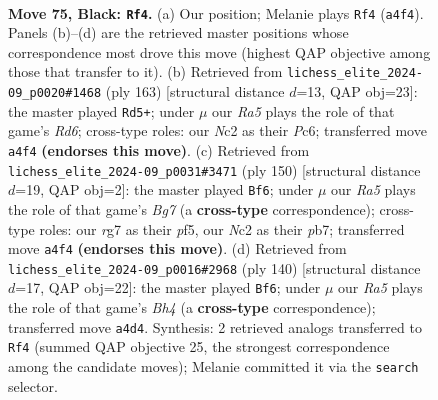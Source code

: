 \documentclass[11pt]{article}
\begin{document}
\clearpage

\begin{figure}[p]\centering
\begin{subfigure}{0.46\textwidth}\centering
\resizebox{\linewidth}{!}{%
\newchessgame
\chessboard[
  setfen={8/6R1/5B1k/8/r7/7K/2n1bP2/8 b - - 11 75},
  showmover=false,
  pgfstyle=straightmove, color=movearrow, markmove={a4-f4}
]}
\caption{}
\end{subfigure}\hfill
\begin{subfigure}{0.46\textwidth}\centering
\resizebox{\linewidth}{!}{%
\newchessgame
\chessboard[
  setfen={5k2/4R3/2pB4/6K1/8/3r4/8/8 b - - 2 82},
  showmover=false,
  pgfstyle=straightmove, color=movearrow, markmove={d3-d5}
]}
\caption{}
\end{subfigure}
\\[4pt]
\begin{subfigure}{0.46\textwidth}\centering
\resizebox{\linewidth}{!}{%
\newchessgame
\chessboard[
  setfen={8/1p4B1/8/P2k1p2/5K2/8/8/1b6 w - - 12 76},
  showmover=false,
  pgfstyle=straightmove, color=movearrow, markmove={g7-f6}
]}
\caption{}
\end{subfigure}\hfill
\begin{subfigure}{0.46\textwidth}\centering
\resizebox{\linewidth}{!}{%
\newchessgame
\chessboard[
  setfen={8/8/4b1K1/5r2/4k2B/8/8/8 w - - 2 71},
  showmover=false,
  pgfstyle=straightmove, color=movearrow, markmove={h4-f6}
]}
\caption{}
\end{subfigure}
\caption{\textbf{Move 75, Black: \texttt{Rf4}.} (a) Our position; Melanie plays \texttt{Rf4} (\texttt{a4f4}). Panels (b)--(d) are the retrieved master positions whose correspondence most drove this move (highest QAP objective among those that transfer to it). (b) Retrieved from \texttt{lichess\_elite\_2024-09\_p0020\#1468} (ply 163) [structural distance $d$=13, QAP obj=23]: the master played \texttt{Rd5+}; under $\mu$ our \emph{Ra5} plays the role of that game's \emph{Rd6}; cross-type roles: our \emph{N}c2 as their \emph{P}c6; transferred move \texttt{a4f4} \textbf{(endorses this move)}. (c) Retrieved from \texttt{lichess\_elite\_2024-09\_p0031\#3471} (ply 150) [structural distance $d$=19, QAP obj=2]: the master played \texttt{Bf6}; under $\mu$ our \emph{Ra5} plays the role of that game's \emph{Bg7} (a \textbf{cross-type} correspondence); cross-type roles: our \emph{r}g7 as their \emph{p}f5, our \emph{N}c2 as their \emph{p}b7; transferred move \texttt{a4f4} \textbf{(endorses this move)}. (d) Retrieved from \texttt{lichess\_elite\_2024-09\_p0016\#2968} (ply 140) [structural distance $d$=17, QAP obj=22]: the master played \texttt{Bf6}; under $\mu$ our \emph{Ra5} plays the role of that game's \emph{Bh4} (a \textbf{cross-type} correspondence); transferred move \texttt{a4d4}. Synthesis: 2 retrieved analogs transferred to \texttt{Rf4} (summed QAP objective 25, the strongest correspondence among the candidate moves); Melanie committed it via the \texttt{search} selector.}
\label{fig:thought-m149}
\end{figure}
\end{document}
